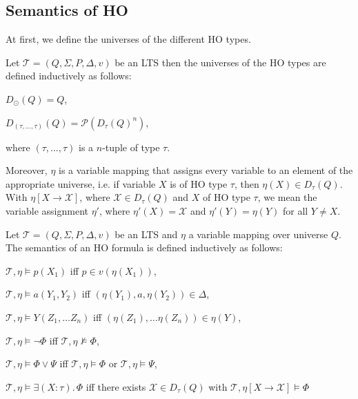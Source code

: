 \subsection{Semantics of HO}\label{subsec:hoSemantics}

At first, we define the universes of the different HO types.

\begin{definition}
    Let $\mathcal{T} = (Q, \Sigma, P, \Delta, v)$ be an LTS then the universes of the HO types are defined inductively as follows:
    \begin{compactitem}
        \item $D_\odot(Q) = Q$,
        \item $D_{(\tau, \dots, \tau)}(Q) = \mathcal{P}(D_{\tau}(Q)^n)$,
    \end{compactitem}
    where $(\tau, \dots, \tau)$ is a $n$-tuple of type $\tau$.
\end{definition}

Moreover, $\eta$ is a variable mapping that assigns every variable to an element of the appropriate universe, i.e. if
variable $X$ is of HO type $\tau$, then $\eta(X) \in D_{\tau}(Q)$. With $\eta[X \rightarrow \mathcal{X}]$,
where $\mathcal{X} \in D_\tau(Q)$ and $X$ of HO type $\tau$, we mean the variable assignment $\eta'$,
where $\eta'(X) = \mathcal{X}$ and $\eta'(Y) = \eta(Y)$ for all $Y \neq X$.

\begin{definition}
    Let $\mathcal{T} = (Q, \Sigma, P, \Delta, v)$ be an LTS and $\eta$ a variable mapping over universe $Q$. The
    semantics of an HO formula is defined inductively as follows:
    \begin{compactitem}
        \item $\mathcal{T}, \eta \models p(X_1)$ iff $p \in v(\eta(X_1))$,
        \item $\mathcal{T}, \eta \models a(Y_1, Y_2)$ iff $(\eta(Y_1), a, \eta(Y_2)) \in \Delta$,
        \item $\mathcal{T}, \eta \models Y(Z_1, \dots Z_n)$ iff $(\eta(Z_1), \dots
        \eta(Z_n)) \in \eta(Y)$,
        \item $\mathcal{T}, \eta \models \neg\Phi$ iff $\mathcal{T}, \eta\not\models\Phi$,
        \item $\mathcal{T}, \eta \models \Phi \vee \Psi$ iff $\mathcal{T}, \eta\models\Phi$ or $\mathcal{T},
        \eta\models\Psi$,
        \item $\mathcal{T}, \eta \models \exists (X\colon\tau).\,\Phi$ iff there exists $\mathcal{X} \in D_{\tau}
        (Q)$ with $\mathcal{T}, \eta[X \rightarrow \mathcal{X}] \models \Phi$
        \end{compactitem}
\end{definition}

